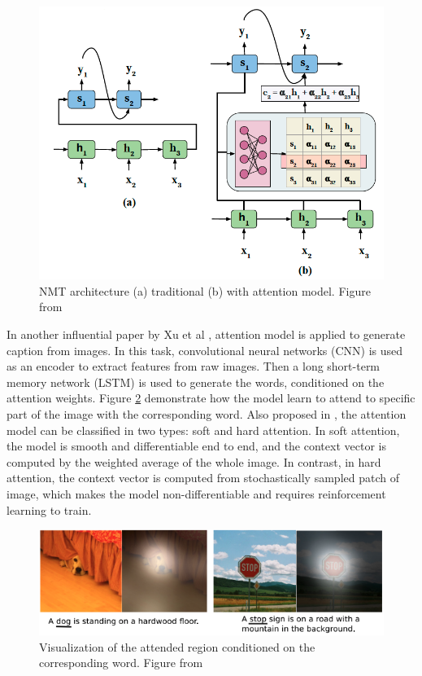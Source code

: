 \documentclass[journal]{IEEEtran}
\begin{document}
\begin{figure}[htb]
  \centering
  \includegraphics[width=0.7\columnwidth]{NMT.png}
  \caption{NMT architecture (a) traditional (b) with attention model.
  Figure from \cite{chaudhari1904attentive}}
  \label{NMT}
\end{figure}

In another influential paper by Xu et al \cite{xu2015show}, attention model is applied to generate caption from images. 
In this task, convolutional neural networks (CNN) is used as an encoder to extract features from raw images.
Then a long short-term memory network (LSTM) is used to generate the words, conditioned on the attention weights.
Figure \ref{attention} demonstrate how the model learn to attend to specific part of the image with the corresponding word. 
Also proposed in \cite{xu2015show}, the attention model can be classified in two types: soft and hard attention. 
In soft attention, the model is smooth and differentiable end to end, and the context vector is computed by the weighted average of the whole image. 
In contrast, in hard attention, the context vector is computed from stochastically sampled patch of image, 
which makes the model non-differentiable and requires reinforcement learning to train.

\begin{figure}[htb]
  \includegraphics[width=\linewidth]{attention.png}
  \caption{Visualization of the attended region conditioned on the corresponding word.
  Figure from \cite{xu2015show}}
  \label{attention}
\end{figure}
\end{document}
